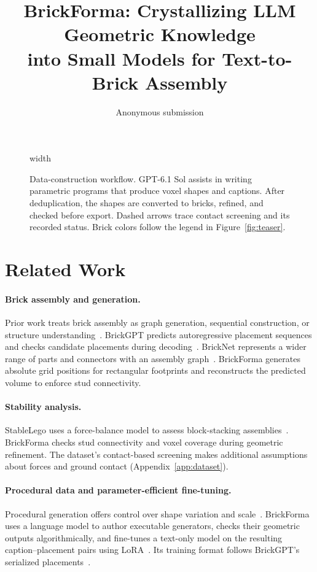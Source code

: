 \documentclass[letterpaper]{article} %
\title{BrickForma: Crystallizing LLM Geometric Knowledge\\into Small Models for Text-to-Brick Assembly}
\author{Anonymous submission}
\begin{document}
\maketitle




\begin{figure}[t]
\centering
\begingroup
\pdfximage width \textwidth {figure2.pdf}%
\pdfrefximage\pdflastximage\endgroup
\caption{Data-construction workflow. GPT-6.1 Sol assists in writing parametric programs that produce voxel shapes and captions. After deduplication, the shapes are converted to bricks, refined, and checked before export. Dashed arrows trace contact screening and its recorded status. Brick colors follow the legend in Figure~\ref{fig:teaser}.}
\label{fig:data-workflow}
\end{figure}

\section{Related Work}
\paragraph{Brick assembly and generation.}
Prior work treats brick assembly as graph generation, sequential construction, or structure understanding~\cite{thompson2020lego,brickbybrick,breakandmake}. BrickGPT predicts autoregressive placement sequences and checks candidate placements during decoding~\cite{brickgpt}. BrickNet represents a wider range of parts and connectors with an assembly graph~\cite{bricknet}. BrickForma generates absolute grid positions for rectangular footprints and reconstructs the predicted volume to enforce stud connectivity.

\paragraph{Stability analysis.}
StableLego uses a force-balance model to assess block-stacking assemblies~\cite{stablelego}. BrickForma checks stud connectivity and voxel coverage during geometric refinement. The dataset's contact-based screening makes additional assumptions about forces and ground contact (Appendix~\ref{app:dataset}).

\paragraph{Procedural data and parameter-efficient fine-tuning.}
Procedural generation offers control over shape variation and scale~\cite{infinigen}. BrickForma uses a language model to author executable generators, checks their geometric outputs algorithmically, and fine-tunes a text-only model on the resulting caption--placement pairs using LoRA~\cite{lora}. Its training format follows BrickGPT's serialized placements~\cite{brickgpt}.
\end{document}

